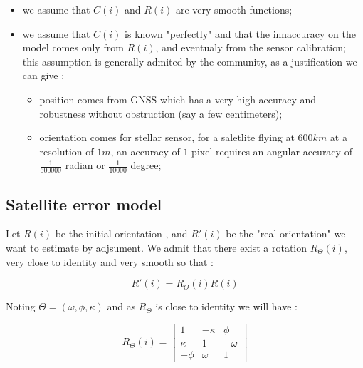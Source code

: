 \begin{itemize}
    \item we assume that $C(i)$  and $R(i)$  are very smooth functions;
    \item we assume that $C(i)$  is known  "perfectly" and that the innaccuracy
          on the model comes only from $R(i)$, and eventualy from the sensor calibration;  this assumption is generally admited
          by the community, as a justification we can give :
    \begin{itemize}
         \item  position comes from GNSS which has a very high accuracy and robustness without obstruction (say a few centimeters);
         \item  orientation comes for stellar sensor, for a saletlite flying at $600km$ at a resolution of $1m$,
                an accuracy of $1$ pixel requires an angular accuracy of $\frac{1}{600000}$ radian or $\frac{1}{10000}$ degree;
     \end{itemize}
\end{itemize}


\subsection{Satellite error model}

\label{PB:SatErMOd}

Let $R(i)$ be the initial orientation , and $R'(i)$ be the "real orientation"
we want to estimate by adjsument.
We admit that there exist a rotation $R_\Theta(i)$, very close to identity and
very smooth so that :

\begin{equation}
    R'(i) = R_\Theta(i) R(i)
\end{equation}

Noting $\Theta=(\omega,\phi,\kappa)$ and as  $R_\Theta$ is close to identity we will have :

%
%
%

\begin{equation}
    R_\Theta(i) = 
\begin{bmatrix}
1 &  - \kappa & \phi\\
\kappa & 1 & -\omega\\
-\phi & \omega & 1
\end{bmatrix} 	
\end{equation}


